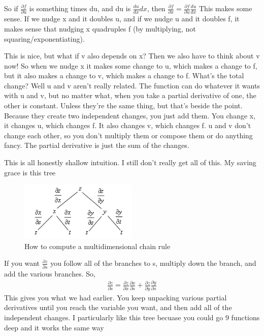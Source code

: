\documentclass[12pt, letterpaper]{article}
\begin{document}
So if $\frac{\partial f}{\partial u}$ is something times du, and du is $\frac{du}{dx} dx$, then $\frac{\partial f}{\partial x} = \frac{\partial f}{\partial u} \frac{du}{dx}$
This makes some sense. If we nudge x and it doubles u, and if we nudge u and it doubles f, it makes sense that nudging x quadruples f (by multiplying, not squaring/exponentiating).

This is nice, but what if v also depends on x? Then we also have to think about v now! So when we nudge x it makes some change to u, which makes a change to f, but it also makes a change to v, which makes a change to f. What's the total change?
Well u and v aren't really related. The function can do whatever it wants with u and v, but no matter what, when you take a partial derivative of one, the other is constant. Unless they're the same thing, but that's beside the point.
Because they create two independent changes, you just add them. You change x, it changes u, which changes f. It also changes v, which changes f. u and v don't change each other, so you don't multiply them or compose them or do anything fancy. The partial derivative is just the sum of the changes.

This is all honestly shallow intuition. I still don't really get all of this. My saving grace is this tree
\begin{figure}[h]
    \centering 
    \includegraphics[width=0.5\textwidth]{chainruletree}
    \caption{How to compute a multidimensional chain rule}
\end{figure}

If you want \large$\frac{\partial z}{\partial s}$ \normalsize you follow all of the branches to s, multiply down the branch, and add the various branches. So,
\begin{gather*}
    \frac{\partial z}{\partial s} = \frac{\partial z}{\partial x} \frac{\partial x}{\partial s} + \frac{\partial z}{\partial y} \frac{\partial y}{\partial s}
\end{gather*}
This gives you what we had earlier. You keep unpacking various partial derivatives until you reach the variable you want, and then add all of the independent changes. I particularly like this tree becuase you could go 9 functions deep and it works the same way
\end{document}
